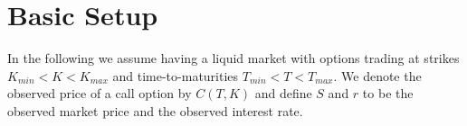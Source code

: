 \section{Basic Setup}
In the following we assume having a liquid market with options trading at strikes $K_{min}<K<K_{max}$ and time-to-maturities $T_{min}<T<T_{max}$. We denote the observed price of a call option by $C(T,K)$ and define $S$ and $r$ to be the observed market price and the observed interest rate.